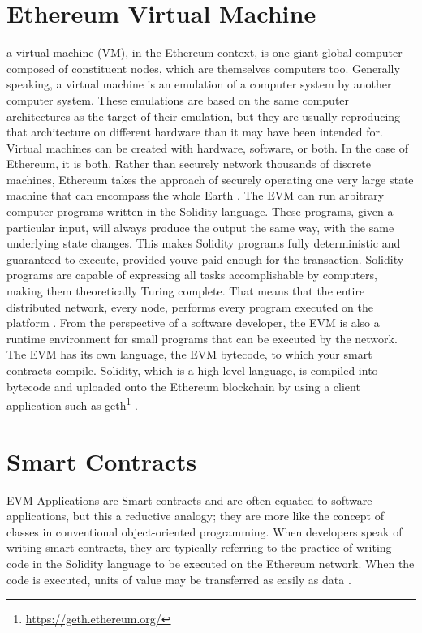 \section{Ethereum Virtual Machine}
a virtual machine (VM), in the Ethereum context, is one giant global computer composed of constituent nodes, which are themselves computers too. Generally speaking, a virtual machine is an emulation of a computer system by another computer system. These emulations are based on the same computer architectures as the target of their emulation, but they are usually reproducing that architecture on different hardware than it may have been intended for. Virtual machines can be created with hardware, software, or both. In the case of Ethereum, it is both. Rather than securely network thousands of discrete machines, Ethereum takes the approach of securely operating one very large state machine that can encompass the whole Earth \cite[48]{dannen2017introducing}.
The EVM can run arbitrary computer programs written in the Solidity language. These programs, given a particular input, will always produce the output the same way, with the same underlying state changes. This makes Solidity programs fully deterministic and guaranteed to execute, provided youve paid enough for the transaction. Solidity programs are capable of expressing all tasks accomplishable by computers, making them theoretically Turing complete. That means that the entire distributed network, every node, performs every program executed on the platform \cite[50]{dannen2017introducing}. 
From the perspective of a software developer, the EVM is also a runtime environment for small programs that can be executed by the network. The EVM has its own language, the EVM bytecode, to which your smart contracts compile. Solidity, which is a high-level language, is compiled into bytecode and uploaded onto the Ethereum blockchain by using a client application such as geth\footnote{\url{https://geth.ethereum.org/}} \cite[51]{dannen2017introducing}.

\section{Smart Contracts}
EVM Applications are Smart contracts and are often equated to software applications, but this a reductive analogy; they are more like the concept of classes in conventional object-oriented programming. When developers speak of writing smart contracts, they are typically referring to the practice of writing code in the Solidity language to be executed on the Ethereum network. When the code is executed, units of value may be transferred as easily as data \cite[10]{dannen2017introducing}.
